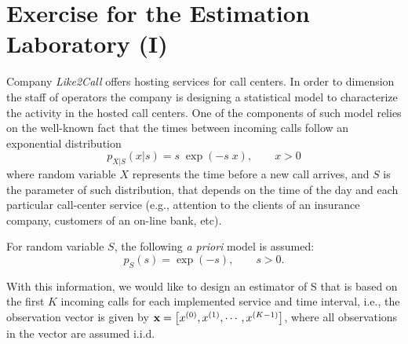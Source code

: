 \section{Exercise for the Estimation Laboratory (I)}

Company {\em Like2Call} offers hosting services for call centers. In order to dimension the staff of operators the company is designing a statistical model to characterize the activity in the hosted call centers. One of the components of such model relies on the well-known fact that the times between incoming calls follow an exponential distribution
$$p_{X|S}(x|s) = s \; \exp(-s\; x), \qquad x>0$$
where random variable $X$ represents the time before a new call arrives, and $S$ is the parameter of such distribution, that depends on the time of the day and each particular call-center service (e.g., attention to the clients of an insurance company, customers of an on-line bank, etc). 

For random variable $S$, the following {\em a priori} model is assumed:
$$p_S(s) = \exp(-s), \qquad s>0.$$

With this information, we would like to design an estimator of S that is based on the first $K$ incoming calls for each implemented service and time interval, i.e., the observation vector is given by ${\bf x} = \left[x^{(0)}, x^{(1)}, \cdots, x^{(K-1)}\right]$, where all observations in the vector are assumed i.i.d.

